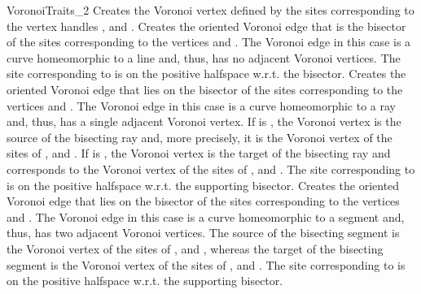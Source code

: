 \begin{ccRefConcept}{VoronoiTraits_2}
%
%
%
\ccThreeToTwo
{}
{Creates the Voronoi vertex defined by the sites corresponding to the
  vertex handles ,  and .}
\ccGlue
{}
{Creates the oriented Voronoi edge that is the bisector of the sites
  corresponding to the vertices  and . The Voronoi
  edge in this case is a curve homeomorphic to a line and, thus, has
  no adjacent Voronoi vertices. The site corresponding to  is
  on the positive halfspace w.r.t. the bisector.}
\ccGlue
{}
{Creates the oriented Voronoi edge that lies on the bisector of the sites
  corresponding to the vertices  and . The Voronoi
  edge in this case is a curve homeomorphic to a ray and, thus, has
  a single adjacent Voronoi vertex. If  is ,
  the Voronoi vertex is the source of the bisecting ray and, more precisely,
  it is the Voronoi vertex of the sites of ,  and
  . If  is , the Voronoi vertex is
  the target of the bisecting ray and corresponds to the Voronoi
  vertex of the sites of ,  and . The site
  corresponding to  is on the positive halfspace w.r.t. the
  supporting bisector.}
\ccGlue
{}
{Creates the oriented Voronoi edge that lies on the bisector of the sites
  corresponding to the vertices  and . The Voronoi
  edge in this case is a curve homeomorphic to a segment and, thus, has
  two adjacent Voronoi vertices. The source of the bisecting segment
  is the Voronoi vertex of the sites of ,  and
  , whereas the target of the bisecting segment is the Voronoi
  vertex of the sites of ,  and . The site
  corresponding to  is on the positive halfspace w.r.t. the
  supporting bisector.}

\ccHasModels
{}\\
\\
\\
\\

\ccSeeAlso
{}\\
\\
\\
\\
\\
\\
\end{ccRefConcept}


